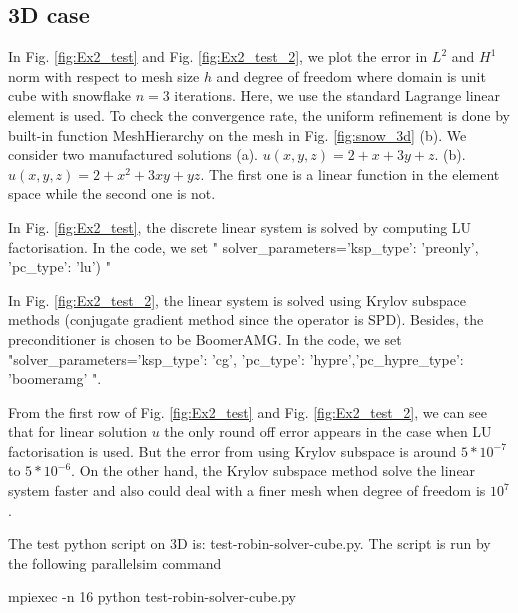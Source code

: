\documentclass[12pt]{article}%
\theoremstyle{plain}
\numberwithin{equation}{section}
\begin{document}
\subsection{3D case}
In Fig. \ref{fig:Ex2_test} and Fig.  \ref{fig:Ex2_test_2}, we plot the error in $L^2$ and $H^1$ norm with respect to mesh size $h$ and degree of freedom where domain is unit cube with snowflake $n=3$ iterations. Here, we use the standard Lagrange linear element is used. To check the convergence rate, the uniform refinement is done by built-in function MeshHierarchy on the mesh in Fig. \ref{fig:snow_3d} (b). We consider two manufactured solutions (a).  $u(x,y,z)= 2+x+3y+z$.  (b). $u(x,y,z)= 2+x^2+3xy+yz$. The first one is a linear function in the element space while the second one is not.

 In Fig. \ref{fig:Ex2_test}, the discrete linear system is solved by computing LU factorisation. In the code, we set " solver\_parameters={'ksp\_type': 'preonly', 'pc\_type': 'lu'}) "
 
 In Fig. \ref{fig:Ex2_test_2}, the linear system is solved using Krylov subspace methods (conjugate gradient method since the operator is SPD). Besides, the preconditioner is chosen to be BoomerAMG. In the code, we set "solver\_parameters={'ksp\_type': 'cg', 'pc\_type': 'hypre','pc\_hypre\_type': 'boomeramg'} ".

From the first row of Fig. \ref{fig:Ex2_test} and Fig. \ref{fig:Ex2_test_2}, we can see that for linear solution $u$ the only round off error appears in the case when LU factorisation is used. But the error from using Krylov subspace is around $5*10^{-7}$ to  $5*10^{-6}$. On the other hand, the Krylov subspace method solve the linear system faster and also could deal with a finer mesh when degree of freedom is $10^7$.

The test python script on 3D is: test-robin-solver-cube.py.  The script is run by the following parallelsim command 

mpiexec -n 16 python test-robin-solver-cube.py
\end{document}
